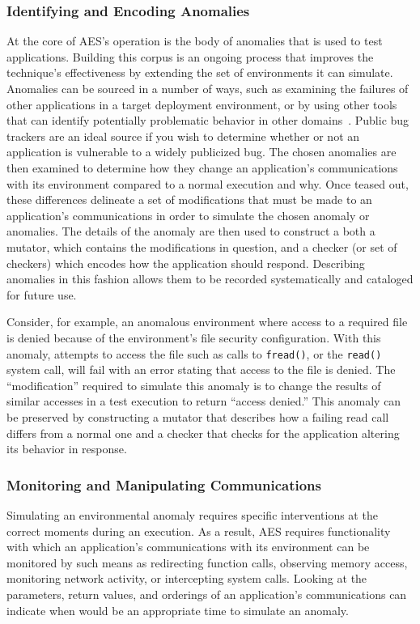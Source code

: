 \subsubsection{Identifying and Encoding Anomalies}
\label{SUBSUB:IdentifyingAndEncoding}
At the core of AES's operation is the body of anomalies that
is used to test applications.
Building this corpus is an ongoing process that improves the technique's
effectiveness by extending the set of environments it can simulate.
Anomalies can be sourced
in a number of ways,
such as
examining the failures of other applications
in a target deployment environment,
or by using other tools that can identify
potentially problematic behavior in other domains~\cite{Zhuang_NSDI_2014,
rasley2015detecting}.
Public bug trackers are an ideal source
if you wish to determine
whether or not an application
is vulnerable to a widely publicized bug.
The chosen anomalies are then examined
to determine how they change an application's communications
with its environment
compared to a normal execution and why.
Once teased out,
these differences delineate
a set of modifications
that must be made to an application's communications
in order to simulate the chosen anomaly or anomalies.
The details of the anomaly are then used to
construct a both a mutator,
which contains the modifications in question,
and a checker
(or set of checkers)
which encodes how the application should respond.
Describing anomalies in this fashion
allows them to be recorded systematically and cataloged for future use.

Consider,
for example,
an anomalous environment
where access to a required file is denied because of
the environment's file security configuration.
With this anomaly,
attempts to access the file
such as calls to {\tt fread()},
or the {\tt read()} system call,
will fail with an error stating that access to the file is denied.
The ``modification'' required to simulate this anomaly
is to change the results of similar accesses
in a test execution
to return ``access denied.''
This anomaly can be preserved by constructing a mutator that describes how
a failing read call differs from a normal one and a checker that checks for
the application altering its behavior in response.

\subsubsection{Monitoring and Manipulating Communications}
\label{SUBSUB:MonitoringAndManipulating}
Simulating an environmental anomaly requires specific interventions at the
correct moments during an execution.
As a result,
AES requires functionality
with which an application's communications
with its environment
can be monitored
by such means as
redirecting function calls,
observing memory access,
monitoring network activity,
or intercepting system calls.
Looking at the parameters,
return values,
and orderings
of an application's communications
can indicate
when would be an appropriate time to simulate an anomaly.


